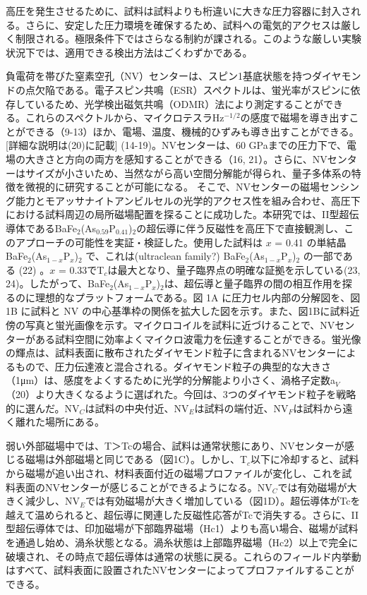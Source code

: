 \documentclass[dvipdfmx]{jsarticle}
\begin{document}
高圧を発生させるために、試料は試料よりも桁違いに大きな圧力容器に封入される。さらに、安定した圧力環境を確保するため、試料への電気的アクセスは厳しく制限される。極限条件下ではさらなる制約が課される。このような厳しい実験状況下では、適用できる検出方法はごくわずかである。

負電荷を帯びた窒素空孔（NV）センターは、スピン1基底状態を持つダイヤモンドの点欠陥である。電子スピン共鳴（ESR）スペクトルは、蛍光率がスピンに依存しているため、光学検出磁気共鳴（ODMR）法により測定することができる。これらのスペクトルから、マイクロテスラHz$^{-1/2}$の感度で磁場を導き出すことができる（9-13）ほか、電場、温度、機械的ひずみも導き出すことができる。[詳細な説明は(20)に記載] (14-19)。NVセンターは、60 GPaまでの圧力下で、電場の大きさと方向の両方を感知することができる（16, 21）。さらに、NVセンターはサイズが小さいため、当然ながら高い空間分解能が得られ、量子多体系の特徴を微視的に研究することが可能になる。 そこで、NVセンターの磁場センシング能力とモアッサナイトアンビルセルの光学的アクセス性を組み合わせ、高圧下における試料周辺の局所磁場配置を探ることに成功した。本研究では、II型超伝導体であるBaFe$_2$(As$_{0.59}$P$_{0.41}$)$_2$の超伝導に伴う反磁性を高圧下で直接観測し、このアプローチの可能性を実証・検証した。使用した試料は $x$ = 0.41 の単結晶 BaFe$_2$(As$_{1-x}$P$_x$)$_2$ で、これは(ultraclean family?) BaFe$_2$(As$_{1-x}$P$_x$)$_2$ の一部である (22) 。$x$ = 0.33でT$_c$は最大となり、量子臨界点の明確な証拠を示している(23, 24)。したがって、BaFe$_2$(As$_{1-x}$P$_x$)$_2$は、超伝導と量子臨界の間の相互作用を探るのに理想的なプラットフォームである。図 1A に圧力セル内部の分解図を、図 1B に試料と NV の中心基準枠の関係を拡大した図を示す。また、図1Bに試料近傍の写真と蛍光画像を示す。マイクロコイルを試料に近づけることで、NVセンターがある試料空間に効率よくマイクロ波電力を伝達することができる。蛍光像の輝点は、試料表面に散布されたダイヤモンド粒子に含まれるNVセンターによるもので、圧力伝達液と混合される。ダイヤモンド粒子の典型的な大きさ（1μm）は、感度をよくするために光学的分解能より小さく、渦格子定数a$_V$（20）より大きくなるように選ばれた。今回は、3つのダイヤモンド粒子を戦略的に選んだ。NV$_{C}$は試料の中央付近、NV$_{E}$は試料の端付近、NV$_{F}$は試料から遠く離れた場所にある。

弱い外部磁場中では、T＞Tcの場合、試料は通常状態にあり、NVセンターが感じる磁場は外部磁場と同じである（図1C）。しかし、T$_c$以下に冷却すると、試料から磁場が追い出され、材料表面付近の磁場プロファイルが変化し、これを試料表面のNVセンターが感じることができるようになる。NV$_{C}$では有効磁場が大きく減少し、NV$_E$では有効磁場が大きく増加している（図1D）。超伝導体がTcを越えて温められると、超伝導に関連した反磁性応答がTcで消失する。さらに、II型超伝導体では、印加磁場が下部臨界磁場（Hc1）よりも高い場合、磁場が試料を通過し始め、渦糸状態となる。渦糸状態は上部臨界磁場（Hc2）以上で完全に破壊され、その時点で超伝導体は通常の状態に戻る。これらのフィールド内挙動はすべて、試料表面に設置されたNVセンターによってプロファイルすることができる。
\end{document}
